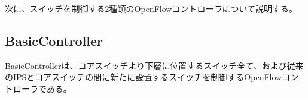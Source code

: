 
次に、スイッチを制御する2種類のOpenFlowコントローラについて説明する。

\subsection{BasicController}

BasicControllerは、コアスイッチより下層に位置するスイッチ全て、および従来のIPSとコアスイッチの間に新たに設置するスイッチを制御するOpenFlowコントローラである。

